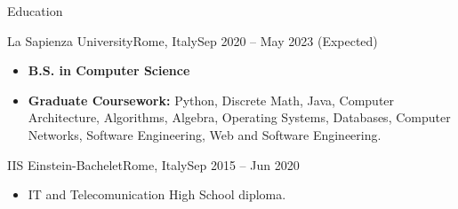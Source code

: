 \documentclass[]{mcdowellcv}
\begin{document}
	\makeheader
	

\begin{cvsection}{Education}
		\begin{cvsubsection}{La Sapienza University}{Rome, Italy}{Sep 2020 -- May 2023 (Expected)}
			\begin{itemize}
				\item \textbf{B.S. in Computer Science}
				\item \textbf{Graduate Coursework:} Python, Discrete Math, Java, Computer Architecture, Algorithms, Algebra, Operating Systems, Databases, Computer Networks, Software Engineering, Web and Software Engineering.
			\end{itemize}
		\end{cvsubsection}
		\begin{cvsubsection}{IIS Einstein-Bachelet}{Rome, Italy}{Sep 2015 -- Jun 2020}
			\begin{itemize}
				\item IT and Telecomunication High School diploma.
			\end{itemize}
		\end{cvsubsection}
	\end{cvsection}
\end{document}

